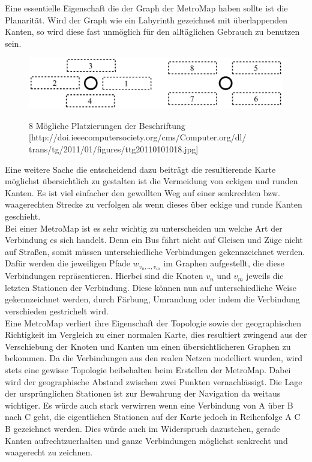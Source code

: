 Eine essentielle Eigenschaft die der Graph der MetroMap haben sollte ist die Planarität. Wird der Graph wie ein Labyrinth gezeichnet mit überlappenden Kanten, so wird diese fast unmöglich für den alltäglichen Gebrauch zu benutzen sein.

\begin{figure}[t]
	\centering
	{\includegraphics[scale=0.3]{bilder/labelplacements}\label{fig_labelplacements}
	}\\
	\caption[8 Mögliche Platzierungen der Beschriftung]{8 Mögliche Platzierungen der Beschriftung [http://doi.ieeecomputersociety.org/cms/Computer.org/dl/ trans/tg/2011/01/figures/ttg20110101018.jpg]}
	\label{fig_labelplacements}
\end{figure}

Eine weitere Sache die entscheidend dazu beiträgt die resultierende Karte möglichst übersichtlich zu gestalten ist die Vermeidung von eckigen und runden Kanten. Es ist viel einfacher den gewollten Weg auf einer senkrechten bzw. waagerechten Strecke zu verfolgen als wenn dieses über eckige und runde Kanten geschieht. \\

Bei einer MetroMap ist es sehr wichtig zu unterscheiden um welche Art der Verbindung es sich handelt. Denn ein Bus fährt nicht auf Gleisen und Züge nicht auf Straßen, somit müssen unterschiedliche Verbindungen gekennzeichnet werden. Dafür werden die jeweiligen Pfade $w_{v_{n}, .., v_{m}}$ im Graphen aufgestellt, die diese Verbindungen repräsentieren. Hierbei sind die Knoten $v_{n}$ und $v_{m}$ jeweils die letzten Stationen der Verbindung. Diese können nun auf unterschiedliche Weise gekennzeichnet werden, durch Färbung, Umrandung oder indem die Verbindung verschieden gestrichelt wird. \\

Eine MetroMap verliert ihre Eigenschaft der Topologie sowie der geographischen Richtigkeit im Vergleich zu einer normalen Karte, dies resultiert zwingend aus der Verschiebung der Knoten und Kanten um einen übersichtlicheren Graphen zu bekommen. Da die Verbindungen aus den realen Netzen modelliert wurden, wird stets eine gewisse Topologie beibehalten beim Erstellen der MetroMap. Dabei wird der geographische Abstand zwischen zwei Punkten vernachlässigt. Die Lage der ursprünglichen Stationen ist zur Bewahrung der Navigation da weitaus wichtiger. Es würde auch stark verwirren wenn eine Verbindung von A über B nach C geht, die eigentlichen Stationen auf der Karte jedoch in Reihenfolge A C B gezeichnet werden. Dies würde auch im Widerspruch dazustehen, gerade Kanten aufrechtzuerhalten und ganze Verbindungen möglichst senkrecht und waagerecht zu zeichnen. \\

